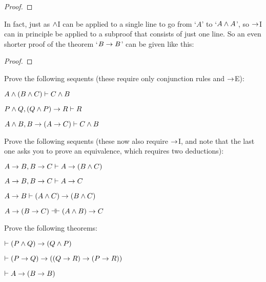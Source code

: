 \begin{proof}
\open
{}
 
\close
{} 
\end{proof}

In fact, just as $\wedge$I can be applied to a single line to go from `$A$' to `$A \wedge A$', so $\rightarrow$I can in principle be applied to a subproof that consists of just one line.  So an even shorter proof of  the theorem `$B \rightarrow B$' can be given like this:\\

\begin{proof}
\open
{}
\close
{} 
\end{proof}

\practiceproblems

\problempart
Prove the following sequents (these require only conjunction rules and $\rightarrow$E):

\begin{earg}
\item $A \wedge (B \wedge C) \vdash C \wedge B$
\item $P \wedge Q, (Q \wedge P) \rightarrow R \vdash R$
\item $A \wedge B, B \rightarrow (A \rightarrow C) \vdash C \wedge B$
\end{earg}

\problempart
Prove the following sequents (these now also require $\rightarrow$I, and note that the last one asks you to prove an equivalence, which requires two deductions):

\begin{earg}
\item $A \rightarrow B, B \rightarrow C \vdash A \rightarrow (B \wedge C)$
\item $A \rightarrow B, B \rightarrow C \vdash A \rightarrow C$
\item $A \rightarrow B \vdash (A \wedge C) \rightarrow (B \wedge C)$
\item $A \eif (B \eif C) \pequiv (A \eand B) \eif C$
\end{earg}


\problempart 
Prove the following theorems:

\begin{earg}
\item $\vdash (P \wedge Q) \rightarrow (Q \wedge P)$
\item $\vdash (P \rightarrow Q) \rightarrow ((Q \rightarrow R) \rightarrow (P \rightarrow R))$
\item $\vdash A \rightarrow (B \rightarrow B)$
\end{earg}









